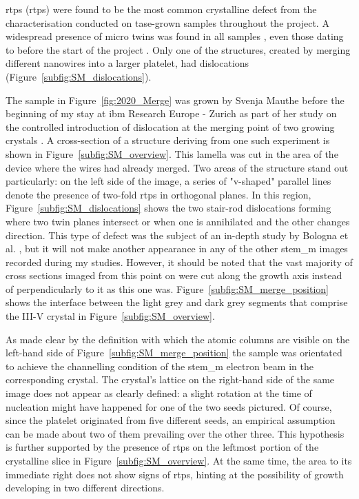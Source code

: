 \Acl{rtp}s (\acs{rtp}s) were found to be the most common crystalline defect from the characterisation conducted on \acs{tase}-grown samples throughout the project. A widespread presence of micro twins was found in all samples \cite{Brugnolotto2023, Brugnolotto2023_2}, even those dating to before the start of the project \cite{Staudinger2018}. Only one of the structures, created by merging different nanowires into a larger platelet, had dislocations (Figure~\ref{subfig:SM_dislocations}). 
\par
The sample in Figure~\ref{fig:2020_Merge} was grown by Svenja Mauthe before the beginning of my stay at \acs{ibm} Research Europe - Zurich as part of her study on the controlled introduction of dislocation at the merging point of two growing crystals \cite{Mauthe2021}. A cross-section of a structure deriving from one such experiment is shown in Figure~\ref{subfig:SM_overview}. This lamella was cut in the area of the device where the wires had already merged. Two areas of the structure stand out particularly: on the left side of the image, a series of "v-shaped" parallel lines denote the presence of two-fold \acf{rtp}s in orthogonal  planes. In this region, Figure~\ref{subfig:SM_dislocations} shows the two stair-rod dislocations forming where two twin planes intersect or when one is annihilated and the other changes direction. This type of defect was the subject of an in-depth study by Bologna et al. \cite{Bologna2018}, but it will not make another appearance in any of the other \acf{stem_m} images recorded during my studies. However, it should be noted that the vast majority of cross sections imaged from this point on were cut along the growth axis instead of perpendicularly to it as this one was. Figure~\ref{subfig:SM_merge_position} shows the interface between the light grey and dark grey segments that comprise the III-V crystal in Figure~\ref{subfig:SM_overview}. 
\par
As made clear by the definition with which the atomic columns are visible on the left-hand side of Figure~\ref{subfig:SM_merge_position} the sample was orientated to achieve the channelling condition of the \acs{stem_m} electron beam in the corresponding crystal. The crystal's lattice on the right-hand side of the same image does not appear as clearly defined: a slight rotation at the time of nucleation might have happened for one of the two seeds pictured. Of course, since the platelet originated from five different seeds, an empirical assumption can be made about two of them prevailing over the other three. This hypothesis is further supported by the presence of \acs{rtp}s on the leftmost portion of the crystalline slice in Figure~\ref{subfig:SM_overview}. At the same time, the area to its immediate right does not show signs of \acs{rtp}s, hinting at the possibility of growth developing in two different directions. 

